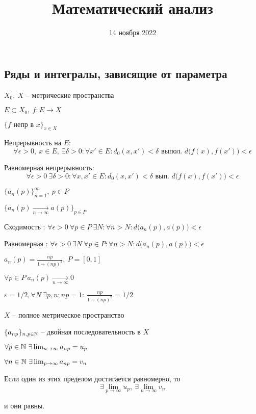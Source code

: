 


    \title{Математический анализ}
    \date{14 ноября 2022}
    \maketitle{}

    \pagebreak

    \subsection*{Ряды и интегралы, зависящие от параметра}

    $X_0, \ X$ -- метрические пространства
    \par $E \subset X_0, \ f : E \rightarrow X$
    \par $\{f \text{ непр в } x\}_{x \in X}$
    \par Непрерывность на $E$:
    \[
        \forall \epsilon > 0, \ x \in E, \ \exists \delta > 0 : \forall x' \in E : d_0(x, x') < \delta \text{ выпол. } d\big(f(x), f(x')\big) < \epsilon    
    \]
    \par Равномерная непрерывность:
    \[
        \forall \epsilon > 0 \ \exists \delta > 0 : \forall x, x' \in E : d_0(x, x') < \delta \text{ вып. } d\big(f(x), f(x')\big) < \epsilon    
    \]

    \par $\{a_n(p)\}_{n = 1}^\infty, \ p \in P$
    \par $\{a_n(p) \xrightarrow[n \rightarrow \infty]{} a(p)\}_{p \in P}$
    \par Сходимость : $\forall \epsilon > 0 \ \forall p \in P \ \exists N : \forall n > N : d\big(a_n(p), a(p)\big) < \epsilon$
    \par Равномерная : $\forall \epsilon > 0 \ \exists N \ \forall p \in P : \forall n > N : d\big(a_n(p), a(p)\big) < \epsilon$

    \begin{illustration}
        $a_n(p) = \frac{np}{1 + (np)^2}, \ P = [0, 1]$

        $\forall p \in P \ a_n(p) \underset{n\to \infty}{\longrightarrow} 0$
  
        $\varepsilon = 1/2, \forall N \ \exists p, n; np=1:\ \frac{np}{1+(np)^2} = 1/2$    
    \end{illustration}

    \begin{theorem}
        $X$ -- полное метрическое пространство
        \par $\{a_{np}\}_{n, p \in \mathbb{N}}$ -- двойная последовательность в $X$
        \par \quad $\forall p \in \mathbb{N} \ \exists \lim_{n \rightarrow \infty} a_{np} = u_p$
        \par \quad $\forall n \in \mathbb{N} \ \exists \lim_{p \rightarrow \infty} a_{np} = v_n$
        \par Если один из этих пределом достигается равномерно, то
        \[
            \exists \lim_{p \rightarrow \infty} u_p, \ \exists \lim_{n \rightarrow \infty} v_n
        \]
        \par и они равны.
    \end{theorem}

